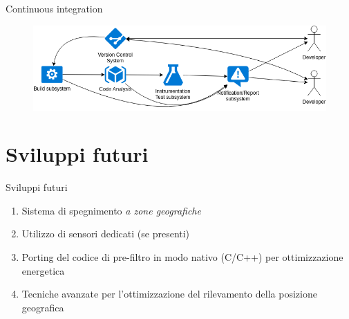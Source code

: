 \begin{frame}[c]{Continuous integration}

\begin{figure}[ht]
\centering
\includegraphics[width=\textwidth]{dev/ci}
\end{figure}

\end{frame}

\section{Sviluppi futuri}

\begin{frame}[c]{Sviluppi futuri}

\begin{enumerate}
	\item Sistema di spegnimento \textit{a zone geografiche}
	\item Utilizzo di sensori dedicati (se presenti)
	\item Porting del codice di pre-filtro in modo nativo (C/C++) per ottimizzazione energetica
	\item Tecniche avanzate per l'ottimizzazione del rilevamento della posizione geografica
\end{enumerate}

\end{frame}

